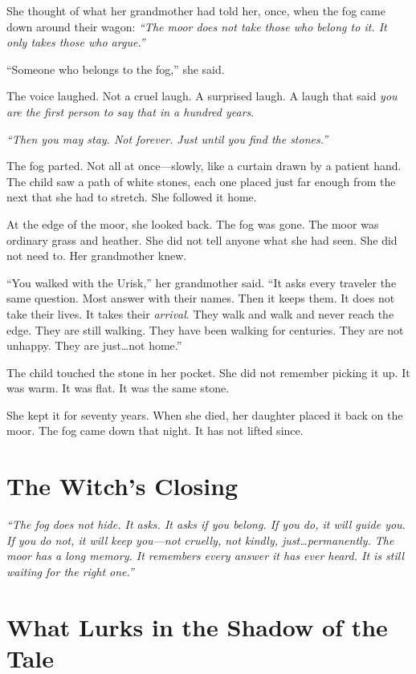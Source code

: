 She thought of what her grandmother had told her, once, when the fog came down around their wagon: \textit{``The moor does not take those who belong to it. It only takes those who argue.''}

``Someone who belongs to the fog,'' she said.

The voice laughed. Not a cruel laugh. A surprised laugh. A laugh that said \textit{you are the first person to say that in a hundred years}.

\textit{``Then you may stay. Not forever. Just until you find the stones.''}

The fog parted. Not all at once---slowly, like a curtain drawn by a patient hand. The child saw a path of white stones, each one placed just far enough from the next that she had to stretch. She followed it home.

At the edge of the moor, she looked back. The fog was gone. The moor was ordinary grass and heather. She did not tell anyone what she had seen. She did not need to. Her grandmother knew.

``You walked with the Urisk,'' her grandmother said. ``It asks every traveler the same question. Most answer with their names. Then it keeps them. It does not take their lives. It takes their \textit{arrival}. They walk and walk and never reach the edge. They are still walking. They have been walking for centuries. They are not unhappy. They are just\dots not home.''

The child touched the stone in her pocket. She did not remember picking it up. It was warm. It was flat. It was the same stone.

She kept it for seventy years. When she died, her daughter placed it back on the moor. The fog came down that night. It has not lifted since.

\section*{The Witch's Closing}
\textit{``The fog does not hide. It asks. It asks if you belong. If you do, it will guide you. If you do not, it will keep you---not cruelly, not kindly, just\dots permanently. The moor has a long memory. It remembers every answer it has ever heard. It is still waiting for the right one.''}

\section*{What Lurks in the Shadow of the Tale}


